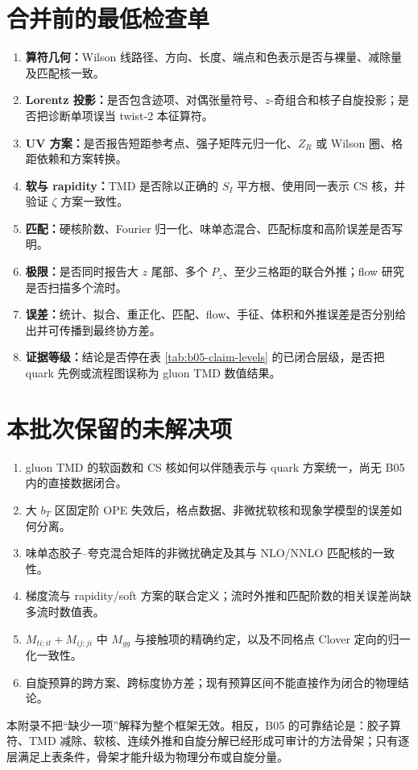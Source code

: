 \section{合并前的最低检查单}

\begin{enumerate}[leftmargin=*]
  \item \textbf{算符几何：}Wilson 线路径、方向、长度、端点和色表示是否与裸量、减除量及匹配核一致。
  \item \textbf{Lorentz 投影：}是否包含迹项、对偶张量符号、\(z\)-奇组合和核子自旋投影；是否把诊断单项误当 twist-2 本征算符。
  \item \textbf{UV 方案：}是否报告短距参考点、强子矩阵元归一化、\(Z_R\) 或 Wilson 圈、格距依赖和方案转换。
  \item \textbf{软与 rapidity：}TMD 是否除以正确的 \(S_I\) 平方根、使用同一表示 CS 核，并验证 \(\zeta\) 方案一致性。
  \item \textbf{匹配：}硬核阶数、Fourier 归一化、味单态混合、匹配标度和高阶误差是否写明。
  \item \textbf{极限：}是否同时报告大 \(z\) 尾部、多个 \(P_z\)、至少三格距的联合外推；flow 研究是否扫描多个流时。
  \item \textbf{误差：}统计、拟合、重正化、匹配、flow、手征、体积和外推误差是否分别给出并可传播到最终协方差。
  \item \textbf{证据等级：}结论是否停在表 \ref{tab:b05-claim-levels} 的已闭合层级，是否把 quark 先例或流程图误称为 gluon TMD 数值结果。
\end{enumerate}

\section{本批次保留的未解决项}

\begin{enumerate}[leftmargin=*]
  \item gluon TMD 的软函数和 CS 核如何以伴随表示与 quark 方案统一，尚无 B05 内的直接数据闭合。
  \item 大 \(b_T\) 区固定阶 OPE 失效后，格点数据、非微扰软核和现象学模型的误差如何分离。
  \item 味单态胶子--夸克混合矩阵的非微扰确定及其与 NLO/NNLO 匹配核的一致性。
  \item 梯度流与 rapidity/soft 方案的联合定义；流时外推和匹配阶数的相关误差尚缺多流时数值表。
  \item \(M_{ti;it}+M_{ij;ji}\) 中 \(M_{gg}\) 与接触项的精确约定，以及不同格点 Clover 定向的归一化一致性。
  \item 自旋预算的跨方案、跨标度协方差；现有预算区间不能直接作为闭合的物理结论。
\end{enumerate}

本附录不把“缺少一项”解释为整个框架无效。相反，B05 的可靠结论是：胶子算符、TMD 减除、软核、连续外推和自旋分解已经形成可审计的方法骨架；只有逐层满足上表条件，骨架才能升级为物理分布或自旋分量。
